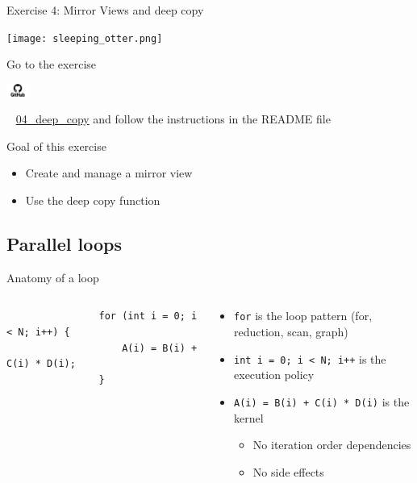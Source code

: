 \documentclass[aspectratio=169]{beamer}
\newcommand{\githublink}[2][2em]{%
    \hspace{-0.25em}%
    \parbox[c][#1][c]{#1}{%
        \includegraphics[width=#1]{GitHub-logo.png}%
    }%
    \hspace{-0.25em}%
    ~%
    #2%
}
\begin{document}

\begin{frame}{Exercise 4: Mirror Views and deep copy}
    \begin{center}
        \texttt{[image: sleeping\_otter.png]}
    \end{center}

    Go to the exercise \githublink{\href{https://github.com/CExA-project/cexa-kokkos-tutorials/tree/main/exercises/04_deep_copy}{04\_deep\_copy}} and follow the instructions in the README file

    \begin{block}{Goal of this exercise}
        \begin{itemize}
            \item Create and manage a mirror view
            \item Use the deep copy function
        \end{itemize}
    \end{block}
\end{frame}


\subsection{Parallel loops}


\begin{frame}[fragile]{Anatomy of a loop}
    \begin{columns}
        \begin{column}{0.5\linewidth}
            \begin{verbatim}
                for (int i = 0; i < N; i++) {
                    A(i) = B(i) + C(i) * D(i);
                }
            \end{verbatim}
        \end{column}
        \begin{column}{0.5\linewidth}
            \begin{itemize}
                \item \texttt{for} is the loop pattern (for, reduction, scan, graph)
                \item \texttt{int i = 0; i < N; i++} is the execution policy
                \item \texttt{A(i) = B(i) + C(i) * D(i)} is the kernel
                \begin{itemize}
                    \item No iteration order dependencies
                    \item No side effects
                \end{itemize}
            \end{itemize}
        \end{column}
    \end{columns}
\end{frame}
\end{document}
